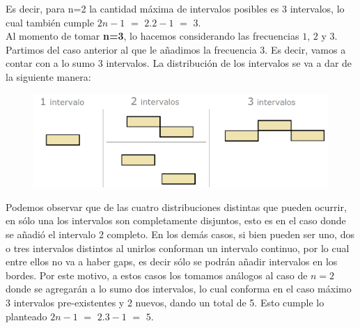 \newpage 

Es decir, para n=2 la cantidad m\'axima de intervalos posibles es $3$ intervalos, lo cual tambi\'en cumple $2n-1$ $=$ $2$.$2-1$ $=$ $3$.\\
 

Al momento de tomar \textbf{n=3}, lo hacemos considerando las frecuencias $1$, $2$ y $3$. Partimos del caso anterior al que le a\~nadimos la frecuencia $3$. Es decir, vamos a contar con a lo sumo $3$ intervalos. La distribuci\'on de los intervalos se va a dar de la siguiente manera:\\

  \begin{figure}[h!]
   \begin{center}
 	\includegraphics[scale=0.45]{imagenes/ej2/secuencias/salida2.png}
   \end{center}
 \end{figure}

Podemos observar que de las cuatro distribuciones distintas que pueden ocurrir, en s\'olo una los intervalos son completamente disjuntos, esto es en el caso donde se a\~nadi\'o el intervalo $2$ completo. En los dem\'as casos, si bien pueden ser uno, dos o tres intervalos distintos al unirlos conforman un intervalo continuo, por lo cual entre ellos no va a haber gaps, es decir s\'olo se podr\'an a\~nadir intervalos en los bordes. Por este motivo, a estos casos los tomamos an\'alogos al caso de $n=2$ donde se agregar\'an a lo sumo dos intervalos, lo cual conforma en el caso m\'aximo 3 intervalos pre-existentes y 2 nuevos, dando un total de 5. Esto cumple lo planteado $2n-1$ $=$ $2$.$3-1$ $=$ $5$.\\

